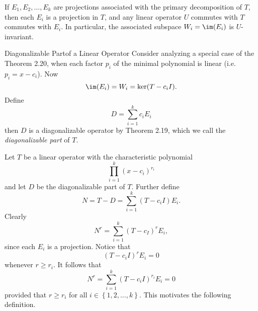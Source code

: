 \documentclass[linearalgebraII]{subfiles}
\begin{document}
    \begin{cor}{}
        If $E_1, E_2, \ldots, E_k$ are projections associated with the primary decomposition of $T$, then each $E_i$ is a projection in $T$, and any linear operator $U$ commutes with $T$ commutes with $E_i$. In particular, the associated subspace $W_i = \im(E_i)$ is $U$-invariant.
    \end{cor}	

    \begin{definition}{Diagonalizable Part}{of a Linear Operator}
        Consider analyzing a special case of the Theorem 2.20, when each factor $p_i$ of the minimal polynomial is linear (i.e. $p_i = x-c_i$). Now
        \begin{equation*}
            \im(E_i) = W_i = \ker(T-c_iI).
        \end{equation*}
        Define
        \begin{equation*}
            D = \sum^{k}_{i=1} c_iE_i
        \end{equation*}
        then $D$ is a diagonalizable operator by Theorem 2.19, which we call the \emph{diagonalizable part} of $T$.
    \end{definition}

    \begin{remark}
        Let $T$ be a linear operator with the characteristic polynomial
        \begin{equation*}
            \prod^{k}_{i=1} (x-c_i)^{r_i}
        \end{equation*}
        and let $D$ be the diagonalizable part of $T$. Further define
        \begin{equation*}
            N = T - D = \sum^{k}_{i=1} (T-c_iI)E_i.
        \end{equation*}
        Clearly
        \begin{equation*}
            N^r = \sum^{k}_{i=1} (T-c_I)^rE_i,
        \end{equation*}
        since each $E_i$ is a projection. Notice that
        \begin{equation*}
            (T-c_iI)^rE_i = 0
        \end{equation*}
        whenever $r\geq r_i$. It follows that
        \begin{equation*}
            N^r = \sum^{k}_{i=1} \left( T-c_iI \right) ^{r_i} E_i = 0 
        \end{equation*}
        provided that $r\geq r_i$ for all $i\in \left\lbrace 1, 2, \ldots, k \right\rbrace$. This motivates the following definition.
    \end{remark}
\end{document}
